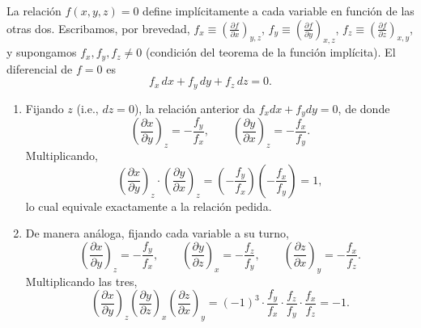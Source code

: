 \documentclass[12pt,a4paper]{article}
\newcommand{\paren}[1]{\left( #1 \right)}
\newcommand{\pd}[3]{\left(\frac{\partial #1}{\partial #2}\right)_{#3}}
\begin{document}
    \begin{solucion}
        La relación $f(x,y,z)=0$ define implícitamente a cada variable en función de las
        otras dos. Escribamos, por brevedad, $f_{x}\equiv\pd{f}{x}{y,z}$, $f_{y}\equiv\pd{f}{y}{x,z}$,
        $f_{z}\equiv\pd{f}{z}{x,y}$, y supongamos $f_{x},f_{y},f_{z}\neq0$ (condición del teorema
        de la función implícita). El diferencial de $f=0$ es
        \begin{equation*}
            f_{x}\,dx+f_{y}\,dy+f_{z}\,dz=0.
        \end{equation*}
        \begin{enumerate}
            \item[(1)] Fijando $z$ (i.e., $dz=0$), la relación anterior da $f_{x}dx+f_{y}dy=0$,
            de donde
            \begin{equation*}
                \pd{x}{y}{z}=-\frac{f_{y}}{f_{x}}, \qquad \pd{y}{x}{z}=-\frac{f_{x}}{f_{y}}.
            \end{equation*}
            Multiplicando,
            \begin{equation*}
                \pd{x}{y}{z}\cdot\pd{y}{x}{z}=\paren{-\frac{f_{y}}{f_{x}}}\paren{-\frac{f_{x}}{f_{y}}}=1,
            \end{equation*}
            lo cual equivale exactamente a la relación pedida.
            \item[(2)] De manera análoga, fijando cada variable a su turno,
            \begin{equation*}
                \pd{x}{y}{z}=-\frac{f_{y}}{f_{x}}, \qquad
                \pd{y}{z}{x}=-\frac{f_{z}}{f_{y}}, \qquad
                \pd{z}{x}{y}=-\frac{f_{x}}{f_{z}}.
            \end{equation*}
            Multiplicando las tres,
            \begin{equation*}
                \pd{x}{y}{z}\pd{y}{z}{x}\pd{z}{x}{y}
                =(-1)^{3}\cdot\frac{f_{y}}{f_{x}}\cdot\frac{f_{z}}{f_{y}}\cdot\frac{f_{x}}{f_{z}}
                =-1.
            \end{equation*}
        \end{enumerate}
    \end{solucion}
\end{document}
